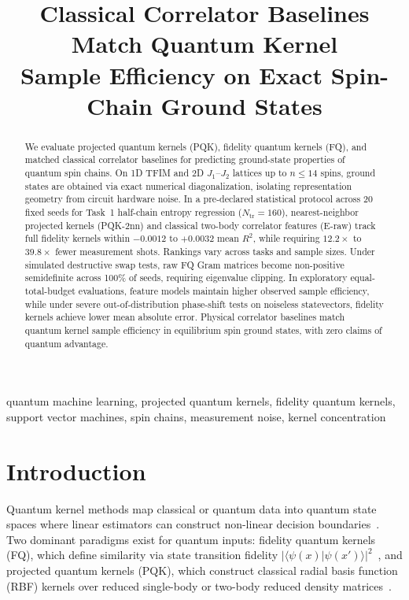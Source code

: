 \documentclass[conference]{IEEEtran}
\begin{document}
\title{Classical Correlator Baselines Match Quantum Kernel\\
Sample Efficiency on Exact Spin-Chain Ground States}

\author{
}

\maketitle

\begin{abstract}
We evaluate projected quantum kernels (PQK), fidelity quantum kernels (FQ),
and matched classical correlator baselines for predicting ground-state
properties of quantum spin chains. On 1D TFIM and 2D $J_1$--$J_2$ lattices
up to $n\le 14$ spins, ground states are obtained via exact numerical
diagonalization, isolating representation geometry from circuit hardware
noise. In a pre-declared statistical protocol across 20 fixed seeds for Task~1
half-chain entropy regression ($N_{\mathrm{tr}}=160$), nearest-neighbor projected
kernels (PQK-2nn) and classical two-body correlator features (E-raw) track
full fidelity kernels within $-0.0012$ to $+0.0032$ mean $R^2$, while requiring
$12.2\times$ to $39.8\times$ fewer measurement shots. Rankings vary across tasks
and sample sizes. Under simulated destructive swap tests, raw FQ Gram matrices
become non-positive semidefinite across 100\% of seeds, requiring eigenvalue
clipping. In exploratory equal-total-budget evaluations, feature models maintain
higher observed sample efficiency, while under severe out-of-distribution
phase-shift tests on noiseless statevectors, fidelity kernels achieve lower mean
absolute error. Physical correlator baselines match quantum kernel sample efficiency
in equilibrium spin ground states, with zero claims of quantum advantage.
\end{abstract}

\begin{IEEEkeywords}
quantum machine learning, projected quantum kernels, fidelity quantum kernels,
support vector machines, spin chains, measurement noise, kernel concentration
\end{IEEEkeywords}

\section{Introduction}
Quantum kernel methods map classical or quantum data into quantum state spaces where linear estimators can construct non-linear decision boundaries~\cite{havlicek2019, schuld2019}. Two dominant paradigms exist for quantum inputs: fidelity quantum kernels (FQ), which define similarity via state transition fidelity $|\langle \psi(x) | \psi(x') \rangle|^2$~\cite{havlicek2019}, and projected quantum kernels (PQK), which construct classical radial basis function (RBF) kernels over reduced single-body or two-body reduced density matrices~\cite{huang2021}.
\end{document}
